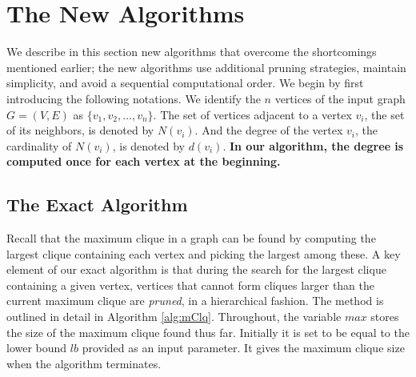 \section{The New Algorithms}
\label{sec:algorithms}
We describe in this section new algorithms that overcome the shortcomings mentioned earlier; 
the new algorithms use additional pruning strategies, maintain simplicity, and 
avoid a sequential computational order.
We begin by first introducing the following notations.
We identify the $n$ vertices of the input graph $G=(V,E)$ as $\{v_1, v_2, \ldots, v_n\}$.  
The set of vertices adjacent to a vertex $v_i$, the set of its neighbors, is denoted by $N(v_i)$.
And the degree of the vertex $v_i$, the cardinality of $N(v_i)$, is 
denoted by $d(v_i)$. {\bf In our algorithm, the degree is computed once for each vertex at the beginning.}

\subsection{The Exact Algorithm}
\label{subsec:exact}

Recall that the maximum clique in a graph can be found by computing the largest clique containing each vertex and picking the largest among these. 
A key element of our exact algorithm is that during the search for the largest clique containing a given vertex, vertices that cannot form cliques larger than the current maximum 
clique are {\em pruned}, in a hierarchical fashion. 
The method is outlined in detail in Algorithm \ref{alg:mClq}. 
Throughout, the variable $max$ stores the size of the maximum clique found 
thus far. Initially it is set to be equal to the lower bound $lb$ provided as an input parameter.
It gives the maximum clique size when the algorithm terminates.

